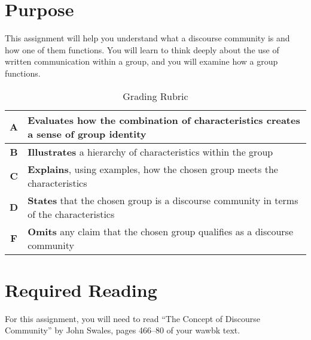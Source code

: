 \documentclass[10pt,oneside,twocolumn]{amsart}	%
\begin{document}
\section{Purpose} %
\label{sec:purpose}
This assignment will help you understand what a discourse community is and how one of them functions. You will learn to think deeply about the use of written communication within a group, and you will examine how a group functions.

\begin{table}[b]
	\caption{Grading Rubric}\label{tab:rubric}
\begin{tabulary}{\columnwidth}{cJ}

\toprule 
\textbf{A} & 	\textbf{Evaluates} how the combination of characteristics creates a sense of group identity	\\
\midrule \textbf{B} & 	\textbf{Illustrates} a hierarchy of characteristics within the group	\\
\midrule \textbf{C} &	\textbf{Explains}, using examples, how the chosen group meets the characteristics	\\
\midrule \textbf{D} &	\textbf{States} that the chosen group is a discourse community in terms of the characteristics		\\
\midrule \textbf{F} &	\textbf{Omits} any claim that the chosen group qualifies as a discourse community	\\
	\bottomrule
\end{tabulary}
\end{table}

	\section{Required Reading} %
	\label{sec:readings}
	For this assignment, you will need to read ``The Concept of Discourse Community'' by John Swales, pages 466--80 of your \ac{wawbk} text.

\end{document}
